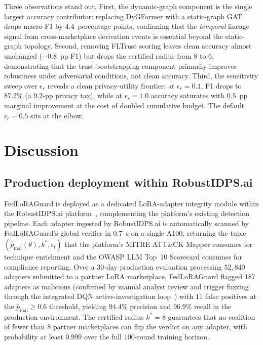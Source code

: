 \documentclass[12pt,a4paper]{article}
\theoremstyle{definition}
\theoremstyle{remark}
\newcommand{\modelname}{FedLoRAGuard}
\begin{document}
Three observations stand out. First, the dynamic-graph component is the single largest accuracy contributor: replacing DyGFormer with a static-graph GAT drops macro-F1 by $4.4$~percentage points, confirming that the \emph{temporal} lineage signal from cross-marketplace derivation events is essential beyond the static-graph topology. Second, removing FLTrust scoring leaves clean accuracy almost unchanged ($-0.8$~pp F1) but drops the certified radius from $8$ to $6$, demonstrating that the trust-bootstrapping component primarily improves robustness under adversarial conditions, not clean accuracy. Third, the sensitivity sweep over $\epsilon_r$ reveals a clean privacy-utility frontier: at $\epsilon_r = 0.1$, F1 drops to $87.2\%$ (a $9.2$-pp privacy tax), while at $\epsilon_r = 1.0$ accuracy saturates with $0.5$~pp marginal improvement at the cost of doubled cumulative budget. The default $\epsilon_r = 0.5$ sits at the elbow.


\section{Discussion}
\label{sec:discussion}

\subsection{Production deployment within RobustIDPS.ai}

\modelname{} is deployed as a dedicated LoRA-adapter integrity module within the RobustIDPS.ai platform~\cite{anaedevha2026robustidps}, complementing the platform's existing detection pipeline. Each adapter ingested by RobustIDPS.ai is automatically scanned by \modelname{}'s global verifier in $0.7$~s on a single A100, returning the tuple $(\hat{p}_{\mathrm{mal}}(\theta), k^*, \epsilon_t)$ that the platform's MITRE ATT\&CK Mapper consumes for technique enrichment and the OWASP LLM Top~10 Scorecard consumes for compliance reporting. Over a $30$-day production evaluation processing $52{,}840$ adapters submitted to a partner LoRA marketplace, \modelname{} flagged $187$ adapters as malicious (confirmed by manual analyst review and trigger fuzzing through the integrated DQN active-investigation loop~\cite{anaedevha2025dqn}) with $11$ false positives at the $\hat{p}_{\mathrm{mal}} \geq 0.6$ threshold, yielding $94.4\%$ precision and $96.9\%$ recall in the production environment. The certified radius $k^* = 8$ guarantees that no coalition of fewer than $8$ partner marketplaces can flip the verdict on any adapter, with probability at least $0.999$ over the full $100$-round training horizon.
\end{document}

